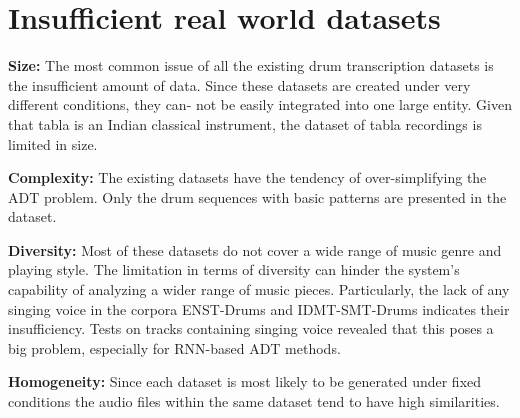 \section{Insufficient real world datasets}

\textbf{Size:}
The most common issue of all the existing drum transcription datasets is the insufficient amount of data. Since these datasets are created under very different conditions, they can- not be easily integrated into one large entity. Given that tabla is an Indian classical instrument, the dataset of tabla recordings is limited in size. 

\textbf{Complexity:}
The existing datasets have the tendency of over-simplifying the ADT problem. Only the drum sequences with basic patterns are presented in the dataset.

\textbf{Diversity:}
Most of these datasets do not cover a wide range of music genre and playing style. The limitation in terms of diversity can hinder the system’s capability of analyzing a wider range of music pieces. Particularly, the lack of any singing voice in the corpora ENST-Drums and IDMT-SMT-Drums indicates their insufficiency. Tests on tracks containing singing voice revealed that this poses a big problem, especially for RNN-based ADT methods. 

\textbf{Homogeneity:}
Since each dataset is most likely to be generated under fixed conditions the audio files within the same dataset tend to have high similarities.